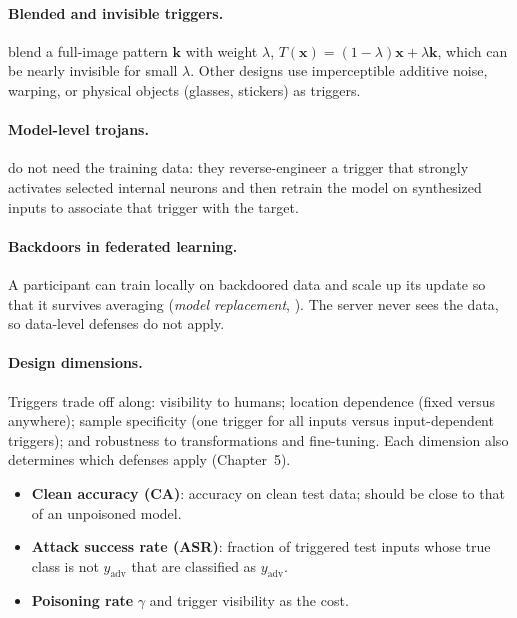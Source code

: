 \documentclass[10pt,a4paper]{extarticle}
\theoremstyle{definition}
\newcommand{\x}{\mathbf{x}}
\begin{document}
\paragraph{Blended and invisible triggers.} \citet{chen2017targeted} blend a full-image pattern \(\mathbf{k}\) with weight \(\lambda\), \(T(\x)=(1-\lambda)\x+\lambda\mathbf{k}\), which can be nearly invisible for small \(\lambda\). Other designs use imperceptible additive noise, warping, or physical objects (glasses, stickers) as triggers.

\paragraph{Model-level trojans.} \citet{liu2018trojaning} do not need the training data: they reverse-engineer a trigger that strongly activates selected internal neurons and then retrain the model on synthesized inputs to associate that trigger with the target.

\paragraph{Backdoors in federated learning.} A participant can train locally on backdoored data and scale up its update so that it survives averaging (\emph{model replacement}, \citealp{bagdasaryan2020backdoor}). The server never sees the data, so data-level defenses do not apply.

\paragraph{Design dimensions.} Triggers trade off along: visibility to humans; location dependence (fixed versus anywhere); sample specificity (one trigger for all inputs versus input-dependent triggers); and robustness to transformations and fine-tuning. Each dimension also determines which defenses apply (Chapter~5).

\begin{keybox}
\begin{itemize}
  \item \textbf{Clean accuracy (CA)}: accuracy on clean test data; should be close to that of an unpoisoned model.
  \item \textbf{Attack success rate (ASR)}: fraction of triggered test inputs whose true class is not \(y_{\text{adv}}\) that are classified as \(y_{\text{adv}}\).
  \item \textbf{Poisoning rate} \(\gamma\) and trigger visibility as the cost.
\end{itemize}
\end{keybox}
\end{document}
